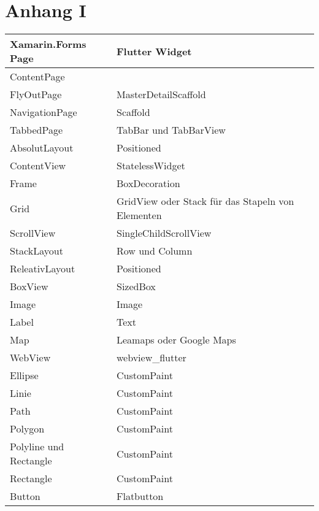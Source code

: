 \backmatter      %
\setcounter{page}{8}

\chapter{Anhang I }
\label{chap:AnhangAndroidScreenshots}

\begin{table}
\begin{tabularx}{\textwidth}{X|X}
   \textbf{Xamarin.Forms Page} & \textbf{Flutter Widget}  \\  
\hline
	ContentPage            			&           	\\ 
	FlyOutPage             			& MasterDetailScaffold          	\\ 
	NavigationPage       			& Scaffold         	 					\\ 
	TabbedPage            			& TabBar und TabBarView 		\\ 
	AbsolutLayout       				&  Positioned	 			\\ 
	ContentView       				&  StatelessWidget	 			\\ 
	Frame       							&  BoxDecoration     	 			\\ 
	Grid            						&  GridView oder Stack für das Stapeln von Elementen						\\ 
	ScrollView            				&  SingleChildScrollView		\\ 
	StackLayout       				&  Row und Column  	 			\\ 
	ReleativLayout           		&  Positioned		\\ 
	BoxView		       				&   	 SizedBox  		\\ 
	Image       							&	     Image	 			\\ 
	Label       							&  	Text 					\\ 
	Map            						&	   	Leamaps oder Google Maps \\ 
	WebView            				&  	webview\_flutter	\\ 
	Ellipse								&  	CustomPaint	\\ 
	Linie									&	  	CustomPaint	\\ 
	Path  								&  	CustomPaint	\\ 
	Polygon  							&  	CustomPaint	\\ 
	Polyline und Rectangle  	&  	CustomPaint	\\ 
	Rectangle  						&  	CustomPaint	\\ 
	Button		       					&  	Flatbutton 		\\ 

\end{tabularx}
\end{table}
